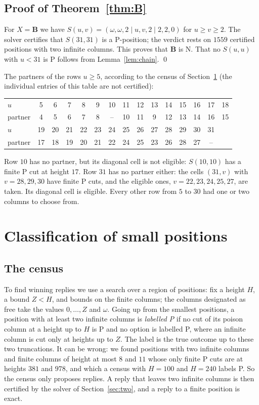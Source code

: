 \documentclass[11pt]{amsart}
\theoremstyle{definition}
\theoremstyle{remark}
\newcommand{\w}{\omega}
\newcommand{\PB}{\mathbf{B}}
\begin{document}
\subsection{Proof of Theorem~\ref{thm:B}}
For $X=\PB$ we have $S(u,v)=(\w,\w,2\mid u,v,2\mid 2,2,0)$ for $u\ge v\ge2$. The solver
certifies that $S(31,31)$ is a P-position; the verdict rests on $1559$ certified positions with
two infinite columns. This proves that $\PB$ is N. That no $S(u,u)$ with $u<31$ is P follows
from Lemma~\ref{lem:chain}. \qed

\medskip
The partners of the rows $u\ge5$, according to the census of Section~\ref{sec:class} (the
individual entries of this table are not certified):
\begin{center}
\small
\begin{tabular}{l*{14}{c}}
\toprule
$u$ & 5 & 6 & 7 & 8 & 9 & 10 & 11 & 12 & 13 & 14 & 15 & 16 & 17 & 18\\
partner & 4 & 5 & 6 & 7 & 8 & -- & 10 & 11 & 9 & 12 & 13 & 14 & 16 & 15\\
\midrule
$u$ & 19 & 20 & 21 & 22 & 23 & 24 & 25 & 26 & 27 & 28 & 29 & 30 & 31 &\\
partner & 17 & 18 & 19 & 20 & 21 & 22 & 24 & 25 & 23 & 26 & 28 & 27 & -- &\\
\bottomrule
\end{tabular}
\end{center}
Row $10$ has no partner, but its diagonal cell is not eligible: $S(10,10)$ has a finite P
cut at height $17$. Row $31$ has no partner either: the cells $(31,v)$ with $v=28,29,30$ have
finite P cuts, and the eligible ones, $v=22,23,24,25,27$, are taken. Its diagonal cell is
eligible. Every other row from $5$ to $30$ had one or two columns to choose from.

\section{Classification of small positions}\label{sec:class}

\subsection{The census}
To find winning replies we use a search over a region of positions: fix a height $H$, a bound
$Z<H$, and bounds on the finite columns; the columns designated as free take the values
$0,\dots,Z$ and $\w$. Going up from the smallest positions, a position with at least two infinite
columns is \emph{labelled P} if no cut of its poison column at a height up to $H$ is P and no
option is labelled P, where an infinite column is cut only at heights up to $Z$. The label is
the true outcome up to these two truncations. It can be wrong: we found positions with two
infinite columns and finite columns of height at most $8$ and $11$ whose only finite P cuts
are at heights $381$ and $978$, and which a census with $H=100$ and $H=240$ labels P. So the
census only proposes replies. A reply that leaves two infinite columns is then certified by
the solver of Section~\ref{sec:two}, and a reply to a finite position is exact.
\end{document}
